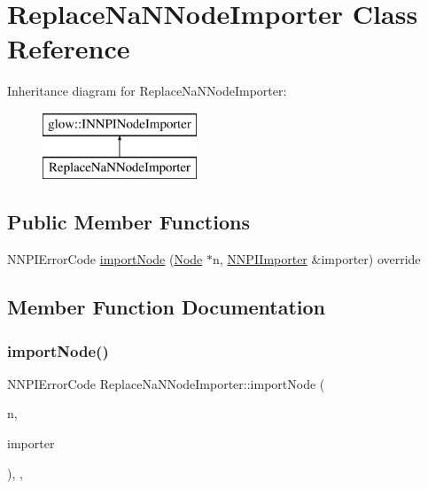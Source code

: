 \hypertarget{class_replace_na_n_node_importer}{}\section{Replace\+Na\+N\+Node\+Importer Class Reference}
\label{class_replace_na_n_node_importer}
Inheritance diagram for Replace\+Na\+N\+Node\+Importer\+:\begin{figure}[H]
\begin{center}
\leavevmode
\includegraphics[height=2.000000cm]{class_replace_na_n_node_importer}
\end{center}
\end{figure}
\subsection*{Public Member Functions}
\begin{DoxyCompactItemize}
\item 
N\+N\+P\+I\+Error\+Code \hyperlink{class_replace_na_n_node_importer_a98622231536e8ac2a1a7090d0bb5a8ca}{import\+Node} (\hyperlink{classglow_1_1_node}{Node} $\ast$n, \hyperlink{classglow_1_1_n_n_p_i_importer}{N\+N\+P\+I\+Importer} \&importer) override
\end{DoxyCompactItemize}


\subsection{Member Function Documentation}
\mbox{\label{class_replace_na_n_node_importer_a98622231536e8ac2a1a7090d0bb5a8ca}} 
\subsubsection{\texorpdfstring{import\+Node()}{importNode()}}
{\footnotesize\ttfamily N\+N\+P\+I\+Error\+Code Replace\+Na\+N\+Node\+Importer\+::import\+Node (\begin{DoxyParamCaption}\item[{\hyperlink{classglow_1_1_node}{Node} $\ast$}]{n,  }\item[{\hyperlink{classglow_1_1_n_n_p_i_importer}{N\+N\+P\+I\+Importer} \&}]{importer }\end{DoxyParamCaption})\hspace{0.3cm}{\ttfamily [inline]}, {\ttfamily [override]}, {\ttfamily [virtual]}}

